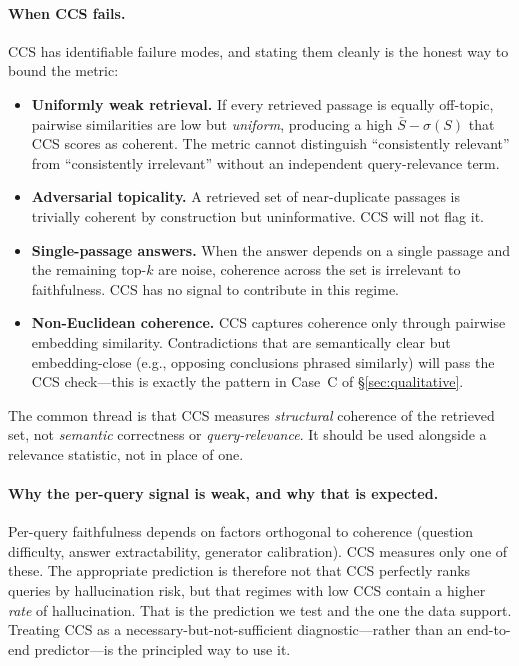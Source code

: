 \paragraph{When CCS fails.}
CCS has identifiable failure modes, and stating them cleanly is the
honest way to bound the metric:
\begin{itemize}
  \item \textbf{Uniformly weak retrieval.} If every retrieved passage is
        equally off-topic, pairwise similarities are low but
        \emph{uniform}, producing a high $\bar S - \sigma(S)$ that CCS
        scores as coherent. The metric cannot distinguish
        ``consistently relevant'' from ``consistently irrelevant''
        without an independent query-relevance term.
  \item \textbf{Adversarial topicality.} A retrieved set of near-duplicate
        passages is trivially coherent by construction but uninformative.
        CCS will not flag it.
  \item \textbf{Single-passage answers.} When the answer depends on a
        single passage and the remaining top-$k$ are noise, coherence
        across the set is irrelevant to faithfulness. CCS has no signal
        to contribute in this regime.
  \item \textbf{Non-Euclidean coherence.} CCS captures coherence only
        through pairwise embedding similarity. Contradictions that are
        semantically clear but embedding-close (e.g., opposing
        conclusions phrased similarly) will pass the CCS check---this is
        exactly the pattern in Case~C of \S\ref{sec:qualitative}.
\end{itemize}
The common thread is that CCS measures \emph{structural} coherence of
the retrieved set, not \emph{semantic} correctness or
\emph{query-relevance}. It should be used alongside a relevance
statistic, not in place of one.

\paragraph{Why the per-query signal is weak, and why that is expected.}
Per-query faithfulness depends on factors orthogonal to coherence
(question difficulty, answer extractability, generator calibration). CCS
measures only one of these. The appropriate prediction is therefore not
that CCS perfectly ranks queries by hallucination risk, but that
regimes with low CCS contain a higher \emph{rate} of hallucination. That
is the prediction we test and the one the data support. Treating CCS as a
necessary-but-not-sufficient diagnostic---rather than an end-to-end
predictor---is the principled way to use it.


